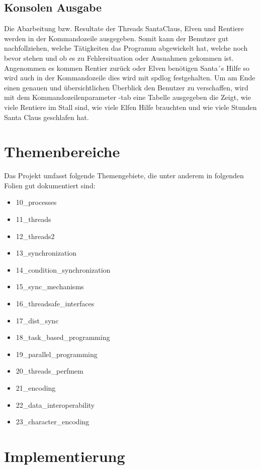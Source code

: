 \documentclass[a4paper,12pt]{exam}
\begin{document}
\subsection{Konsolen Ausgabe}
Die Abarbeitung bzw. Resultate der Threads SantaClaus, Elven und Rentiere werden in der Kommandozeile ausgegeben. Somit kann der Benutzer gut nachfollziehen, welche Tätigkeiten das Programm abgewickelt hat, welche noch bevor stehen und
ob es zu Fehlersituation oder Ausnahmen gekommen ist. Angenommen es kommen Rentier zurück oder Elven benötigen Santa´s Hilfe so wird auch in der Kommandozeile dies wird mit spdlog festgehalten. Um am Ende einen genauen und übersichtlichen 
Überblick den Benutzer zu verschaffen, wird mit dem Kommandozeilenparameter -tab eine Tabelle ausgegeben die Zeigt, wie viele Rentiere im Stall sind, wie viele Elfen Hilfe brauchten und wie viele Stunden Santa Claus geschlafen hat.
\newpage

\section{Themenbereiche}
Das Projekt umfasst folgende Themengebiete, die unter anderem in folgenden Folien gut dokumentiert sind:
    \begin{itemize}
        \item  10\_processes
        \item  11\_threads
        \item  12\_threads2 
        \item  13\_synchronization 
        \item  14\_condition\_synchronization 
        \item  15\_sync\_mechanisms 
        \item  16\_threadsafe\_interfaces 
        \item  17\_dist\_sync 
        \item  18\_task\_based\_programming 
        \item  19\_parallel\_programming 
        \item  20\_threads\_perfmem
        \item  21\_encoding
        \item  22\_data\_interoperability
        \item  23\_character\_encoding
    \end{itemize} 
\newpage
\section{Implementierung}
\end{document}
